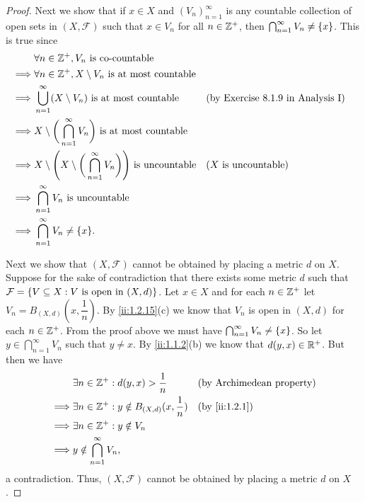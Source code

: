\begin{proof}
  Next we show that if \(x \in X\) and \((V_n)_{n = 1}^\infty\) is any countable collection of open sets in \((X, \mathcal{F})\) such that \(x \in V_n\) for all \(n \in \mathbb{Z}^+\), then \(\bigcap_{n = 1}^\infty V_n \neq \left\lbrace x\right\rbrace\).
  This is true since
  \begin{align*}
             & \forall n \in \Z^+, V_n \text{ is co-countable}                                                                                                 \\
    \implies & \forall n \in \Z^+, X \setminus V_n \text{ is at most countable}                                                                                \\
    \implies & \bigcup_{n = 1}^\infty (X \setminus V_n) \text{ is at most countable}                             &  & \text{(by Exercise 8.1.9 in Analysis I)} \\
    \implies & X \setminus \bigg(\bigcap_{n = 1}^\infty V_n\bigg) \text{ is at most countable}                                                                 \\
    \implies & X \setminus \Bigg(X \setminus \bigg(\bigcap_{n = 1}^\infty V_n\bigg)\Bigg) \text{ is uncountable} &  & \text{(\(X\) is uncountable)}            \\
    \implies & \bigcap_{n = 1}^\infty V_n \text{ is uncountable}                                                                                               \\
    \implies & \bigcap_{n = 1}^\infty V_n \neq \set{x}.
  \end{align*}

  Next we show that \((X, \mathcal{F})\) cannot be obtained by placing a metric \(d\) on \(X\).
  Suppose for the sake of contradiction that there exists some metric \(d\) such that \(\mathcal{F} = \left\lbrace V \subseteq X : V \text{ is open in } (X, d)\right\rbrace\).
  Let \(x \in X\) and for each \(n \in \mathbb{Z}^+\) let \(V_n = B_{(X, d)}(x, \dfrac{1}{n})\).
  By \cref{ii:1.2.15}(c) we know that \(V_n\) is open in \((X, d)\) for each \(n \in \mathbb{Z}^+\).
  From the proof above we must have \(\bigcap_{n = 1}^\infty V_n \neq \left\lbrace x\right\rbrace\).
  So let \(y \in \bigcap_{n = 1}^\infty V_n\) such that \(y \neq x\).
  By \cref{ii:1.1.2}(b) we know that \(d(y, x) \in \mathbb{R}^+\).
  But then we have
  \begin{align*}
             & \exists n \in \Z^+ : d(y, x) > \dfrac{1}{n}               &  & \text{(by Archimedean property)} \\
    \implies & \exists n \in \Z^+ : y \notin B_{(X, d)}(x, \dfrac{1}{n}) &  & \by{ii:1.2.1}                    \\
    \implies & \exists n \in \Z^+ : y \notin V_n                                                               \\
    \implies & y \notin \bigcap_{n = 1}^\infty V_n,
  \end{align*}
  a contradiction.
  Thus, \((X, \mathcal{F})\) cannot be obtained by placing a metric \(d\) on \(X\).


\end{proof}
